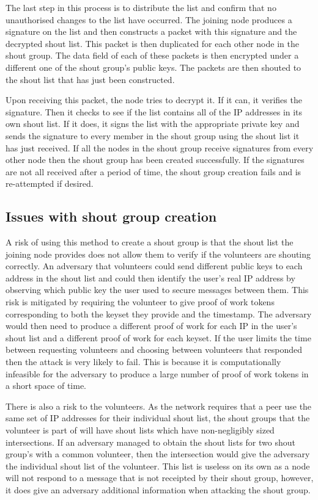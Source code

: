 \documentclass[ %
                    author={Luke Murray},
                supervisor={Dr. Simon Hollis},
                     title={Shadow Peer-to-Peer Networks},
                  subtitle={},
                    degree={MEng},
                      year={2013} ]{thesis}
\begin{document}
The last step in this process is to distribute the list and confirm that no unauthorised changes to the list have occurred. The joining node produces a signature on the list and then constructs a packet with this signature and the decrypted shout list. This packet is then duplicated for each other node in the shout group. The data field of each of these packets is then encrypted under a different one of the shout group's public keys. The packets are then shouted to the shout list that has just been constructed.

Upon receiving this packet, the node tries to decrypt it. If it can, it verifies the signature. Then it checks to see if the list contains all of the IP addresses in its own shout list. If it does, it signs the list with the appropriate private key and sends the signature to every member in the shout group using the shout list it has just received. If all the nodes in the shout group receive signatures from every other node then the shout group has been created successfully. If the signatures are not all received after a period of time, the shout group creation fails and is re-attempted if desired.

\subsection{Issues with shout group creation}

A risk of using this method to create a shout group is that the shout list the joining node provides does not allow them to verify if the volunteers are shouting correctly. An adversary that volunteers could send different public keys to each address in the shout list and could then identify the user's real IP address by observing which public key the user used to secure messages between them. This risk is mitigated by requiring the volunteer to give proof of work tokens corresponding to both the keyset they provide and the timestamp. The adversary would then need to produce a different proof of work for each IP in the user's shout list and a different proof of work for each keyset. If the user limits the time between requesting volunteers and choosing between volunteers that responded then the attack is very likely to fail. This is because it is computationally infeasible for the adversary to produce a large number of proof of work tokens in a short space of time.

There is also a risk to the volunteers. As the network requires that a peer use the same set of IP addresses for their individual shout list, the shout groups that the volunteer is part of will have shout lists which have non-negligibly sized intersections. If an adversary managed to obtain the shout lists for two shout group's with a common volunteer, then the intersection would give the adversary the individual shout list of the volunteer. This list is useless on its own as a node will not respond to a message that is not receipted by their shout group, however, it does give an adversary additional information when attacking the shout group.
\end{document}
